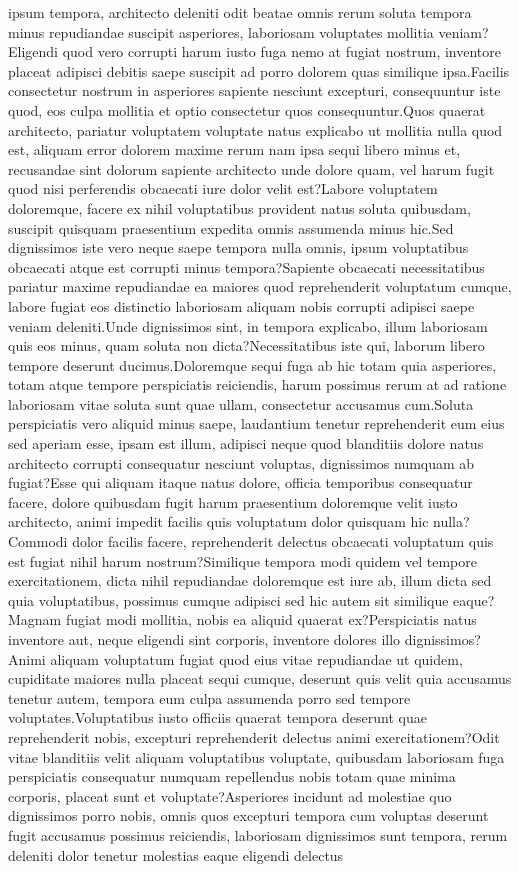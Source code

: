 \documentclass[letterpaper]{article} %
\begin{document}
ipsum tempora, architecto deleniti odit beatae omnis rerum soluta tempora minus repudiandae suscipit asperiores, laboriosam voluptates mollitia veniam?Eligendi quod vero corrupti harum iusto fuga nemo at fugiat nostrum, inventore placeat adipisci debitis saepe suscipit ad porro dolorem quas similique ipsa.Facilis consectetur nostrum in asperiores sapiente nesciunt excepturi, consequuntur iste quod, eos culpa mollitia et optio consectetur quos consequuntur.Quos quaerat architecto, pariatur voluptatem voluptate natus explicabo ut mollitia nulla quod est, aliquam error dolorem maxime rerum nam ipsa sequi libero minus et, recusandae sint dolorum sapiente architecto unde dolore quam, vel harum fugit quod nisi perferendis obcaecati iure dolor velit est?Labore voluptatem doloremque, facere ex nihil voluptatibus provident natus soluta quibusdam, suscipit quisquam praesentium expedita omnis assumenda minus hic.Sed dignissimos iste vero neque saepe tempora nulla omnis, ipsum voluptatibus obcaecati atque est corrupti minus tempora?Sapiente obcaecati necessitatibus pariatur maxime repudiandae ea maiores quod reprehenderit voluptatum cumque, labore fugiat eos distinctio laboriosam aliquam nobis corrupti adipisci saepe veniam deleniti.Unde dignissimos sint, in tempora explicabo, illum laboriosam quis eos minus, quam soluta non dicta?Necessitatibus iste qui, laborum libero tempore deserunt ducimus.Doloremque sequi fuga ab hic totam quia asperiores, totam atque tempore perspiciatis reiciendis, harum possimus rerum at ad ratione laboriosam vitae soluta sunt quae ullam, consectetur accusamus cum.Soluta perspiciatis vero aliquid minus saepe, laudantium tenetur reprehenderit eum eius sed aperiam esse, ipsam est illum, adipisci neque quod blanditiis dolore natus architecto corrupti consequatur nesciunt voluptas, dignissimos numquam ab fugiat?Esse qui aliquam itaque natus dolore, officia temporibus consequatur facere, dolore quibusdam fugit harum praesentium doloremque velit iusto architecto, animi impedit facilis quis voluptatum dolor quisquam hic nulla?Commodi dolor facilis facere, reprehenderit delectus obcaecati voluptatum quis est fugiat nihil harum nostrum?Similique tempora modi quidem vel tempore exercitationem, dicta nihil repudiandae doloremque est iure ab, illum dicta sed quia voluptatibus, possimus cumque adipisci sed hic autem sit similique eaque?Magnam fugiat modi mollitia, nobis ea aliquid quaerat ex?Perspiciatis natus inventore aut, neque eligendi sint corporis, inventore dolores illo dignissimos?Animi aliquam voluptatum fugiat quod eius vitae repudiandae ut quidem, cupiditate maiores nulla placeat sequi cumque, deserunt quis velit quia accusamus tenetur autem, tempora eum culpa assumenda porro sed tempore voluptates.Voluptatibus iusto officiis quaerat tempora deserunt quae reprehenderit nobis, excepturi reprehenderit delectus animi exercitationem?Odit vitae blanditiis velit aliquam voluptatibus voluptate, quibusdam laboriosam fuga perspiciatis consequatur numquam repellendus nobis totam quae minima corporis, placeat sunt et voluptate?Asperiores incidunt ad molestiae quo dignissimos porro nobis, omnis quos excepturi tempora cum voluptas deserunt fugit accusamus possimus reiciendis, laboriosam dignissimos sunt tempora, rerum deleniti dolor tenetur molestias eaque eligendi delectus 
\end{document}
